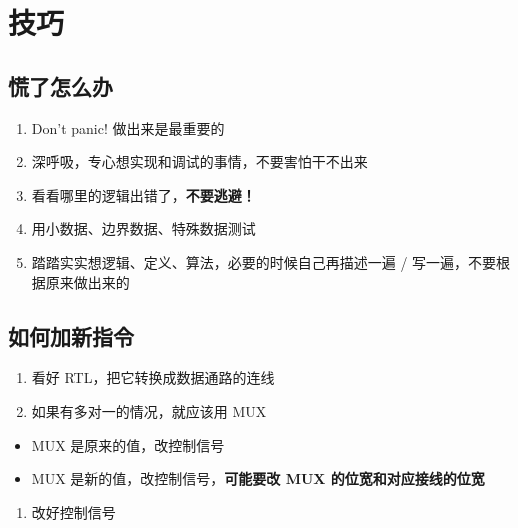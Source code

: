 \documentclass[12pt,AutoFakeBold]{article}
\providecommand{\tightlist}{%
  \setlength{\itemsep}{0pt}\setlength{\parskip}{0pt}}
\begin{document}
\hypertarget{ux6280ux5de7}{%
\section{技巧}\label{ux6280ux5de7}}

\hypertarget{ux614cux4e86ux600eux4e48ux529e}{%
\subsection{慌了怎么办}\label{ux614cux4e86ux600eux4e48ux529e}}

\begin{enumerate}
\def\labelenumi{\arabic{enumi}.}
\tightlist
\item
  Don't panic! 做出来是最重要的
\item
  深呼吸，专心想实现和调试的事情，不要害怕干不出来
\item
  看看哪里的逻辑出错了，\textbf{不要逃避！}
\item
  用小数据、边界数据、特殊数据测试
\item
  踏踏实实想逻辑、定义、算法，必要的时候自己再描述一遍 /
  写一遍，不要根据原来做出来的
\end{enumerate}

\hypertarget{ux5982ux4f55ux52a0ux65b0ux6307ux4ee4}{%
\subsection{如何加新指令}\label{ux5982ux4f55ux52a0ux65b0ux6307ux4ee4}}

\begin{enumerate}
\def\labelenumi{\arabic{enumi}.}
\tightlist
\item
  看好 RTL，把它转换成数据通路的连线
\item
  如果有多对一的情况，就应该用 MUX
\end{enumerate}

\begin{itemize}
\tightlist
\item
  MUX 是原来的值，改控制信号
\item
  MUX 是新的值，改控制信号，\textbf{可能要改 MUX 的位宽和对应接线的位宽}
\end{itemize}

\begin{enumerate}
\def\labelenumi{\arabic{enumi}.}
\setcounter{enumi}{2}
\tightlist
\item
  改好控制信号
\end{enumerate}
\end{document}
